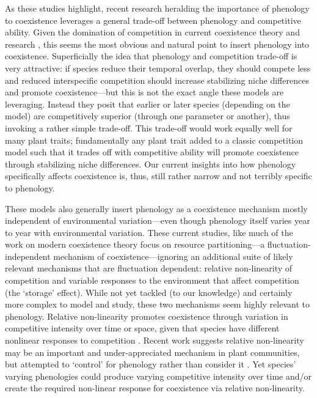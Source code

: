 \documentclass[11pt]{article}
\newcommand{\R}[1]{\label{}\linelabel{#1}}
\begin{document}
As these studies highlight, recent research heralding the importance of phenology to coexistence leverages a general trade-off between phenology and competitive ability. Given the domination of competition in current coexistence theory and research \citep{mcpeek2022coexistence}, this seems the most obvious and natural point to insert phenology into coexistence. Superficially the idea that phenology and competition trade-off is very attractive: if species reduce their temporal overlap, they should compete less and reduced interspecific competition should increase stabilizing niche differences and promote coexistence---but this is not the exact angle these models are leveraging. Instead they posit that earlier or later species (depending on the model) are competitively superior (through one parameter or another), thus invoking a rather simple trade-off. This trade-off would work equally well for many plant traits; fundamentally any plant trait added to a classic competition model such that it trades off with competitive ability will promote coexistence through stabilizing niche differences. Our current insights into how phenology specifically affects coexistence is, thus, still rather narrow and not terribly specific to phenology. 

These models also generally insert phenology as a coexistence mechanism mostly independent of environmental variation---even though phenology itself varies year to year with environmental variation. These current studies, like much of the work on modern coexistence theory focus on resource partitioning---a fluctuation-independent mechanism of coexistence---ignoring an additional suite of likely relevant mechanisms that are fluctuation dependent: relative non-linearity of competition and variable responses to the environment that affect competition (the `storage' effect)\R{definestorage1}. While not yet tackled (to our knowledge) and certainly more complex to model and study, these two mechanisms seem highly relevant to phenology. Relative non-linearity promotes coexistence through variation in competitive intensity over time or space, given that species have different nonlinear responses to competition \citep{CHESSON:1994vn,Chesson:2000vd}. Recent work suggests relative non-linearity may be an important and under-appreciated mechanism in plant communities, but attempted to `control' for phenology rather than consider it \citep{hallett2019rainfall}. Yet species' varying phenologies could produce varying competitive intensity over time and/or create the required non-linear response for coexistence via relative non-linearity. \R{definestorage2}
\end{document}
